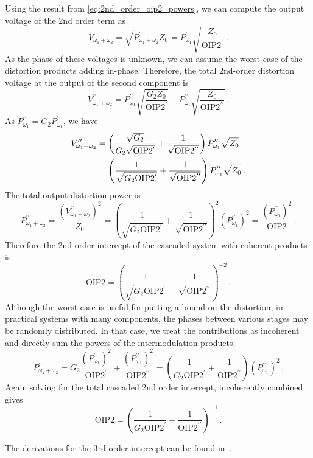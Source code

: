 Using the result from \autoref{eq:2nd_order_oip2_powers}, we can compute the output voltage of the 2nd order term as
\begin{equation}
    V_{\omega_1+\omega_2}^\prime = \sqrt{P_{\omega_1+\omega_2}^\prime Z_0} = P_{\omega_{1}}^\prime\sqrt{\frac{Z_0}{\text{OIP2}^\prime}}\,.
\end{equation}
As the phase of these voltages is unknown, we can assume the worst-case of the distortion products adding in-phase.
Therefore, the total 2nd-order distortion voltage at the output of the second component is
\begin{equation}
    V_{\omega_1+\omega_2}^{\prime \prime} = P_{\omega_{1}}^\prime\sqrt{\frac{G_2Z_0}{\text{OIP2}^\prime}} + P_{\omega_{1}}^{\prime \prime}\sqrt{\frac{Z_0}{\text{OIP2}^{\prime \prime}}}\,.
\end{equation}
As $P_{\omega_{1}}^{\prime \prime}=G_2P_{\omega_{1}}^{\prime}$, we have
\begin{align}
    V_{\omega_1+\omega_2}^{\prime \prime} &= \left(
    \frac{\sqrt{G_2}}{G_2\sqrt{\text{OIP2}^\prime}} + \frac{1}{\sqrt{\text{OIP2}^{\prime \prime}}}
    \right)P_{\omega_{1}}^{\prime \prime}\sqrt{Z_0} \notag\\
    & =
    \left(
    \frac{1}{\sqrt{G_2\text{OIP2}^\prime}} + \frac{1}{\sqrt{\text{OIP2}^{\prime \prime}}}
    \right)P_{\omega_{1}}^{\prime \prime}\sqrt{Z_0}\,.
\end{align}
The total output distortion power is
\begin{equation}
    P_{\omega_1+\omega_2}^{\prime \prime} = \frac{\left(V_{\omega_1+\omega_2}^{\prime \prime}\right)^2}{Z_0}
    =    \left(
    \frac{1}{\sqrt{G_2\text{OIP2}^\prime}} + \frac{1}{\sqrt{\text{OIP2}^{\prime \prime}}}
    \right)^2(P_{\omega_{1}}^{\prime \prime})^2
    = \frac{(P_{\omega_{1}}^{\prime \prime})^2}{\text{OIP2}}\,.
\end{equation}
Therefore the 2nd order intercept of the cascaded system with coherent products is
\begin{equation}
    \text{OIP2} = \left(
    \frac{1}{\sqrt{G_2\text{OIP2}^\prime}} + \frac{1}{\sqrt{\text{OIP2}^{\prime \prime}}}
    \right)^{-2}\,.
\end{equation}
Although the worst case is useful for putting a bound on the distortion, in practical systems with many components, the phases between various stages may be randomly distributed.
In that case, we treat the contributions as incoherent and directly sum the powers of the intermodulation products.
\begin{equation}
    P_{\omega_1+\omega_2}^{\prime \prime} = G_2\frac{(P_{\omega_1}^{\prime})^2}{\text{OIP2}^{\prime}}+ \frac{(P_{\omega_1}^{\prime \prime})^2}{\text{OIP2}^{\prime \prime}} = \left(
    \frac{1}{G_2\text{OIP2}^{\prime}} + \frac{1}{\text{OIP2}^{\prime \prime}}
    \right)(P_{\omega_1}^{\prime \prime})^2\,.
\end{equation}
Again solving for the total cascaded 2nd order intercept, incoherently combined gives
\begin{equation}
    \text{OIP2} = \left(
    \frac{1}{G_2\text{OIP2}^{\prime}} + \frac{1}{\text{OIP2}^{\prime \prime}}
    \right)^{-1}\,.
\end{equation}

The derivations for the 3rd order intercept can be found in~\cite{pozarMicrowaveEngineering2012}.